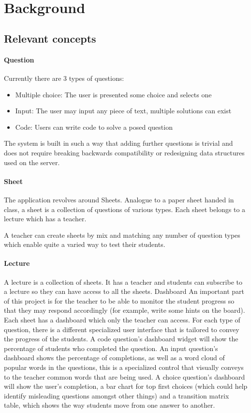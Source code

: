 \documentclass[12pt]{article}
\begin{document}
\section{Background}
\subsection{Relevant concepts}
\paragraph{Question}
Currently there are 3 types of questions:
\begin{itemize}
\item Multiple choice: The user is presented some choice and selects one
\item Input: The user may input any piece of text, multiple solutions can exist
\item Code: Users can write code to solve a posed question
\end{itemize}

The system is built in such a way that adding further questions is trivial and does not require breaking backwards compatibility or redesigning data structures used on the server.

\paragraph{Sheet}
The application revolves around Sheets. Analogue to a paper sheet handed in class, a sheet is a collection of questions of various types. Each sheet belongs to a lecture which has a teacher.


A teacher can create sheets by mix and matching any number of question types which enable quite a varied way to test their students.

\paragraph{Lecture}
A lecture is a collection of sheets. It has a teacher and students can subscribe to a lecture so they can have access to all the sheets.
Dashboard
An important part of this project is for the teacher to be able to monitor the student progress so that they may respond accordingly (for example, write some hints on the board). Each sheet has a dashboard which only the teacher can access.
For each type of question, there is a different specialized user interface that is tailored to convey the progress of the students.
A code question's dashboard widget will show the percentage of students who completed the question. 
An input question’s dashboard shows the percentage of completions, as well as a word cloud of popular words in the questions, this is a specialized control that visually conveys to the teacher common words that are being used.
A choice question’s dashboard will show the user’s completion, a bar chart for top first choices (which could help identify misleading questions amongst other things) and a transition matrix table, which shows the way students move from one answer to another.
\end{document}
